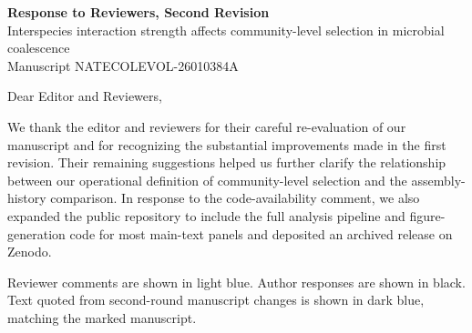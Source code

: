 \documentclass[11pt]{article}
\newif\ifresponsedraft
\begin{document}
\ifresponsedraft
\begin{center}
{\color{DraftRed}\Large\textbf{WORKING DRAFT: NOT FOR SUBMISSION}}
\end{center}
\fi

\begin{center}
{\Large \textbf{Response to Reviewers, Second Revision}}\\[0.5em]
{\large Interspecies interaction strength affects community-level selection in microbial coalescence}\\[0.35em]
{\normalsize Manuscript NATECOLEVOL-26010384A}
\end{center}

Dear Editor and Reviewers,

We thank the editor and reviewers for their careful re-evaluation of our manuscript and for recognizing the substantial improvements made in the first revision. Their remaining suggestions helped us further clarify the relationship between our operational definition of community-level selection and the assembly-history comparison. In response to the code-availability comment, we also expanded the public repository to include the full analysis pipeline and figure-generation code for most main-text panels and deposited an archived release on Zenodo.

\textcolor{ReviewerSkyBlue}{Reviewer comments are shown in light blue.} Author responses are shown in black. \textcolor{SecondRoundBlue}{Text quoted from second-round manuscript changes is shown in dark blue, matching the marked manuscript.}


\clearpage

\clearpage

\end{document}
